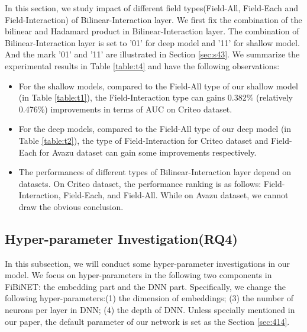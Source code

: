 \documentclass[sigconf]{acmart}
\begin{document}
In this section, we study impact of different field types(Field-All, Field-Each and Field-Interaction) of Bilinear-Interaction layer. We
first fix the combination of the bilinear and Hadamard product in
Bilinear-Interaction layer. The combination of Bilinear-Interaction
layer is set to '01' for deep model and '11' for shallow model. And the
mark '01' and '11' are illustrated in Section \ref{sec:s43}. We summarize the experimental results in
Table \ref{table:t4} and have the following observations:
\begin{itemize}
\item
  For the shallow models, compared to the Field-All type of our shallow model (in Table \ref{table:t1}),
  the Field-Interaction type can gains
  0.382\% (relatively 0.476\%) improvements in terms of AUC on Criteo dataset.
\item
  For the deep models, compared to the Field-All type of our deep model (in Table
  \ref{table:t2}), the type of Field-Interaction for Criteo dataset and Field-Each for Avazu dataset can gain some improvements respectively.
\item
  The performances of different types of Bilinear-Interaction layer depend on datasets. On Criteo dataset, the performance ranking is as follows: Field-Interaction, Field-Each, and Field-All. While on Avazu dataset, we cannot draw the obvious conclusion. 
\end{itemize}

\subsection{Hyper-parameter Investigation(RQ4)}
In this subsection, we will conduct some hyper-parameter investigations in our model. We focus on hyper-parameters in the following two components in FiBiNET: the embedding part and the DNN part. Specifically, we change the following hyper-parameters:(1) the dimension of
embeddings; (3) the number of
neurons per layer in DNN; (4) the depth of DNN. Unless specially
mentioned in our paper, the default parameter of our network is set as
the Section \ref{sec:414}.
\end{document}
